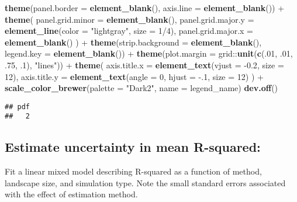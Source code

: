 \documentclass[11pt,]{article}
\newenvironment{Shaded}{\begin{snugshade}}{\end{snugshade}}
\newcommand{\KeywordTok}[1]{\textcolor[rgb]{0.13,0.29,0.53}{\textbf{{#1}}}}
\newcommand{\DataTypeTok}[1]{\textcolor[rgb]{0.13,0.29,0.53}{{#1}}}
\newcommand{\DecValTok}[1]{\textcolor[rgb]{0.00,0.00,0.81}{{#1}}}
\newcommand{\FloatTok}[1]{\textcolor[rgb]{0.00,0.00,0.81}{{#1}}}
\newcommand{\StringTok}[1]{\textcolor[rgb]{0.31,0.60,0.02}{{#1}}}
\newcommand{\NormalTok}[1]{{#1}}
\begin{document}
\begin{Shaded}
\begin{Highlighting}[]
\StringTok{  }\KeywordTok{theme}\NormalTok{(}\DataTypeTok{panel.border =} \KeywordTok{element_blank}\NormalTok{(), }\DataTypeTok{axis.line =} \KeywordTok{element_blank}\NormalTok{()) +}\StringTok{ }
\StringTok{  }\KeywordTok{theme}\NormalTok{(}
    \DataTypeTok{panel.grid.minor =} \KeywordTok{element_blank}\NormalTok{(), }
    \DataTypeTok{panel.grid.major.y =} \KeywordTok{element_line}\NormalTok{(}\DataTypeTok{color =} \StringTok{"lightgray"}\NormalTok{, }\DataTypeTok{size =} \DecValTok{1}\NormalTok{/}\DecValTok{4}\NormalTok{), }
    \DataTypeTok{panel.grid.major.x =} \KeywordTok{element_blank}\NormalTok{()}
  \NormalTok{) +}\StringTok{ }
\StringTok{  }\KeywordTok{theme}\NormalTok{(}\DataTypeTok{strip.background =} \KeywordTok{element_blank}\NormalTok{(), }\DataTypeTok{legend.key =} \KeywordTok{element_blank}\NormalTok{()) +}\StringTok{ }
\StringTok{  }\KeywordTok{theme}\NormalTok{(}\DataTypeTok{plot.margin =} \NormalTok{grid::}\KeywordTok{unit}\NormalTok{(}\KeywordTok{c}\NormalTok{(.}\DecValTok{01}\NormalTok{, .}\DecValTok{01}\NormalTok{, .}\DecValTok{75}\NormalTok{, .}\DecValTok{1}\NormalTok{), }\StringTok{"lines"}\NormalTok{)) +}\StringTok{ }
\StringTok{  }\KeywordTok{theme}\NormalTok{(}
    \DataTypeTok{axis.title.x =} \KeywordTok{element_text}\NormalTok{(}\DataTypeTok{vjust =} \NormalTok{-}\FloatTok{0.2}\NormalTok{, }\DataTypeTok{size =} \DecValTok{12}\NormalTok{), }
    \DataTypeTok{axis.title.y =} \KeywordTok{element_text}\NormalTok{(}\DataTypeTok{angle =} \DecValTok{0}\NormalTok{, }\DataTypeTok{hjust =} \NormalTok{-.}\DecValTok{1}\NormalTok{, }\DataTypeTok{size =} \DecValTok{12}\NormalTok{)}
  \NormalTok{) +}\StringTok{ }
\StringTok{  }\KeywordTok{scale_color_brewer}\NormalTok{(}\DataTypeTok{palette =} \StringTok{"Dark2"}\NormalTok{, }\DataTypeTok{name =} \NormalTok{legend_name)}
\KeywordTok{dev.off}\NormalTok{()}
\end{Highlighting}
\end{Shaded}

\begin{verbatim}
## pdf 
##   2
\end{verbatim}

\subsection{Estimate uncertainty in mean
R-squared:}\label{estimate-uncertainty-in-mean-r-squared}

Fit a linear mixed model describing R-squared as a function of method,
landscape size, and simulation type. Note the small standard errors
associated with the effect of estimation method.
\end{document}
